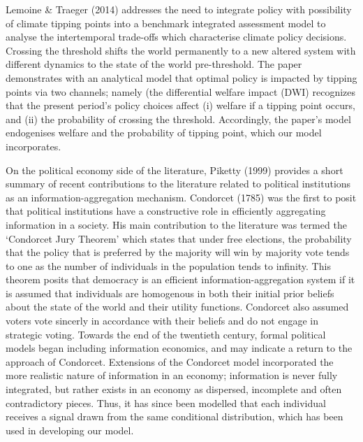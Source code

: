 \documentclass[11pt,preprint, authoryear]{elsarticle}
\numberwithin{equation}{section}
\numberwithin{figure}{section}
\numberwithin{table}{section}
\begin{document}
Lemoine \& Traeger (2014) addresses the need to integrate policy with
possibility of climate tipping points into a benchmark integrated
assessment model to analyse the intertemporal trade-offs which
characterise climate policy decisions. Crossing the threshold shifts the
world permanently to a new altered system with different dynamics to the
state of the world pre-threshold. The paper demonstrates with an
analytical model that optimal policy is impacted by tipping points via
two channels; namely (the differential welfare impact (DWI) recognizes
that the present period's policy choices affect (i) welfare if a tipping
point occurs, and (ii) the probability of crossing the threshold.
Accordingly, the paper's model endogenises welfare and the probability
of tipping point, which our model incorporates.

On the political economy side of the literature, Piketty (1999) provides
a short summary of recent contributions to the literature related to
political institutions as an information-aggregation mechanism.
Condorcet (1785) was the first to posit that political institutions have
a constructive role in efficiently aggregating information in a society.
His main contribution to the literature was termed the `Condorcet Jury
Theorem' which states that under free elections, the probability that
the policy that is preferred by the majority will win by majority vote
tends to one as the number of individuals in the population tends to
infinity. This theorem posits that democracy is an efficient
information-aggregation system if it is assumed that individuals are
homogenous in both their initial prior beliefs about the state of the
world and their utility functions. Condorcet also assumed voters vote
sincerly in accordance with their beliefs and do not engage in strategic
voting. Towards the end of the twentieth century, formal political
models began including information economics, and may indicate a return
to the approach of Condorcet. Extensions of the Condorcet model
incorporated the more realistic nature of information in an economy;
information is never fully integrated, but rather exists in an economy
as dispersed, incomplete and often contradictory pieces. Thus, it has
since been modelled that each individual receives a signal drawn from
the same conditional distribution, which has been used in developing our
model.
\end{document}
